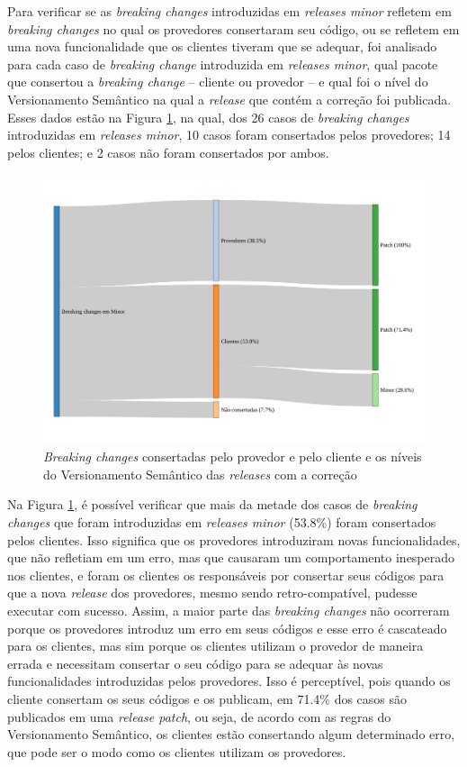 Para verificar se as \textit{breaking changes} introduzidas em \textit{releases minor} refletem em \textit{breaking changes} no qual os provedores consertaram seu código, ou se refletem em uma nova funcionalidade que os clientes tiveram que se adequar, foi analisado para cada caso de \textit{breaking change} introduzida em \textit{releases minor}, qual pacote que consertou a \textit{breaking change} -- cliente ou provedor -- e qual foi o nível do Versionamento Semântico na qual a \textit{release} que contém a correção foi publicada. Esses dados estão na Figura \ref{fig:semver_fixed}, na qual, dos 26 casos de \textit{breaking changes} introduzidas em \textit{releases minor}, 10 casos foram consertados pelos provedores; 14 pelos clientes; e 2 casos não foram consertados por ambos.

\begin{figure}
    \centering
    \includegraphics[scale=0.5]{figuras/semver_fixed.pdf}
    \caption{\textit{Breaking changes} consertadas pelo provedor e pelo cliente e os níveis do Versionamento Semântico das \textit{releases} com a correção}
    \label{fig:semver_fixed}
\end{figure}{}

Na Figura \ref{fig:semver_fixed}, é possível verificar que mais da metade dos casos de \textit{breaking changes} que foram introduzidas em \textit{releases minor} (53.8\%) foram consertados pelos clientes. Isso significa que os provedores introduziram novas funcionalidades, que não refletiam em um erro, mas que causaram um comportamento inesperado nos clientes, e foram os clientes os responsáveis por consertar seus códigos para que a nova \textit{release} dos provedores, mesmo sendo retro-compatível, pudesse executar com sucesso. Assim, a maior parte das \textit{breaking changes} não ocorreram porque os provedores introduz um erro em seus códigos e esse erro é cascateado para os clientes, mas sim porque os clientes utilizam o provedor de maneira errada e necessitam consertar o seu código para se adequar às novas funcionalidades introduzidas pelos provedores. Isso é perceptível, pois quando os cliente consertam os seus códigos e os publicam, em 71.4\% dos casos são publicados em uma \textit{release patch}, ou seja, de acordo com as regras do Versionamento Semântico, os clientes estão consertando algum determinado erro, que pode ser o modo como os clientes utilizam os provedores.

